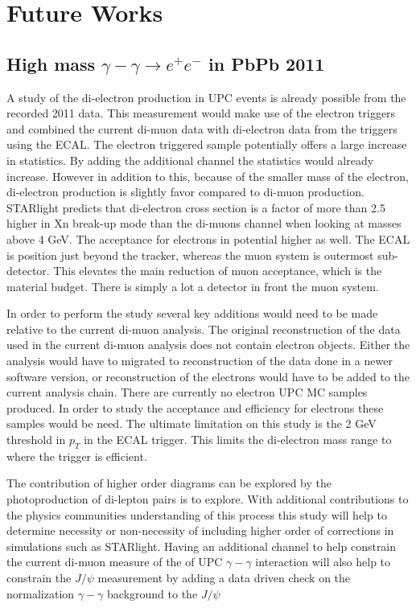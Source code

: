 \chapter{Future Works}	
\section{High mass $\gamma-\gamma \rightarrow e^{+} e^{-}$  in PbPb 2011}
    A study of the di-electron production in UPC events is already possible 
      from the recorded 2011 data. 
    This measurement would make use of the electron triggers and combined the 
      current di-muon data with di-electron data from the triggers using the
      ECAL. 
    The electron triggered sample potentially offers a large increase in 
      statistics. 
    By adding the additional channel the statistics would already increase.
    However in addition to this, because of the smaller mass of the electron,
      di-electron production is slightly favor compared to di-muon 
      production.
    STARlight predicts that di-electron cross section is a factor of more than 
      2.5 higher in Xn break-up mode than the di-muons channel when looking 
      at masses above 4 GeV.
    The acceptance for electrons in potential higher as well. 
    The ECAL is position just beyond the tracker, whereas the muon system is 
      outermost sub-detector. 
    This elevates the main reduction of muon acceptance, which is the material
      budget. 
    There is simply a lot a detector in front the muon system.

    In order to perform the study several key additions would need to be made
      relative to the current di-muon analysis. 
    The original reconstruction of the data used in the current di-muon 
      analysis does not contain electron objects. 
    Either the analysis would have to migrated to reconstruction of the data
      done in a newer software version, or reconstruction of the electrons 
      would have to be added to the current analysis chain. 
    There are currently no electron UPC MC samples produced. 
    In order to study the acceptance and efficiency for electrons these samples
      would be need. 
    The ultimate limitation on this study is the 2 GeV threshold in $p_{T}$ in
      the ECAL trigger. 
    This limits the di-electron mass range to where the trigger is efficient. 

    The contribution of higher order diagrams can be explored by the 
      photoproduction of di-lepton pairs is to explore.
    With additional contributions to the physics communities understanding of 
      this process this study will help to determine necessity or 
      non-necessity of including higher order of corrections in simulations 
      such as STARlight.
    Having an additional channel to help constrain the current di-muon measure 
      of the of UPC $\gamma-\gamma$ interaction will also help to constrain 
      the $J/\psi$ measurement by adding a data driven check on the 
      normalization $\gamma-\gamma$ background to the $J/\psi$
    
